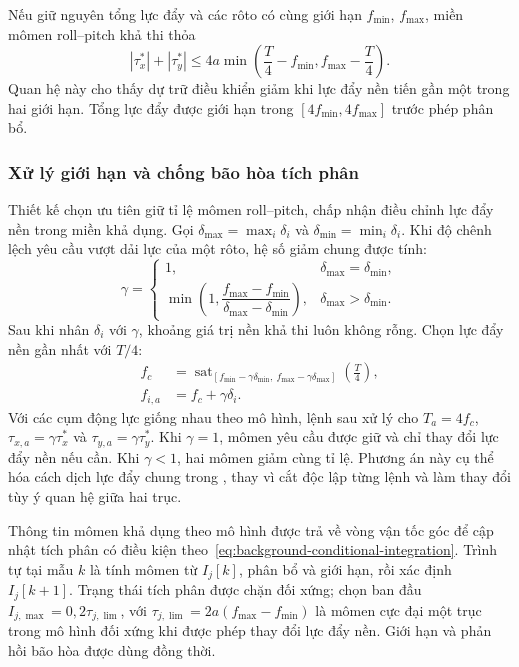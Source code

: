 Nếu giữ nguyên tổng lực đẩy và các rôto có cùng giới hạn $f_{\min}$, $f_{\max}$, miền mômen roll--pitch khả thi thỏa
\begin{equation}
	|\tau_x^*|+|\tau_y^*|
	\leq4a\min\left(\frac{T}{4}-f_{\min},
	f_{\max}-\frac{T}{4}\right).
	\label{eq:design-feasible-torque}
\end{equation}
Quan hệ này cho thấy dự trữ điều khiển giảm khi lực đẩy nền tiến gần một trong hai giới hạn. Tổng lực đẩy được giới hạn trong $[4f_{\min},4f_{\max}]$ trước phép phân bổ.

\subsubsection{Xử lý giới hạn và chống bão hòa tích phân}

Thiết kế chọn ưu tiên giữ tỉ lệ mômen roll--pitch, chấp nhận điều chỉnh lực đẩy nền trong miền khả dụng. Gọi $\delta_{\max}=\max_i\delta_i$ và $\delta_{\min}=\min_i\delta_i$. Khi độ chênh lệch yêu cầu vượt dải lực của một rôto, hệ số giảm chung được tính:
\begin{equation}
	\gamma=
	\begin{cases}
		1, & \delta_{\max}=\delta_{\min}, \\
		\min\left(1,\dfrac{f_{\max}-f_{\min}}
		{\delta_{\max}-\delta_{\min}}\right),
		   & \delta_{\max}>\delta_{\min}.
	\end{cases}
	\label{eq:design-allocation-scaling}
\end{equation}
Sau khi nhân $\delta_i$ với $\gamma$, khoảng giá trị nền khả thi luôn không rỗng. Chọn lực đẩy nền gần nhất với $T/4$:
\begin{equation}
	\begin{aligned}
		f_c     & =\operatorname{sat}_{
				[f_{\min}-\gamma\delta_{\min},\
		f_{\max}-\gamma\delta_{\max}]}\left(\frac{T}{4}\right), \\
		f_{i,a} & =f_c+\gamma\delta_i.
	\end{aligned}
	\label{eq:design-allocation-collective}
\end{equation}
Với các cụm động lực giống nhau theo mô hình, lệnh sau xử lý cho $T_a=4f_c$, $\tau_{x,a}=\gamma\tau_x^*$ và $\tau_{y,a}=\gamma\tau_y^*$. Khi $\gamma=1$, mômen yêu cầu được giữ và chỉ thay đổi lực đẩy nền nếu cần. Khi $\gamma<1$, hai mômen giảm cùng tỉ lệ. Phương án này cụ thể hóa cách dịch lực đẩy chung trong , thay vì cắt độc lập từng lệnh và làm thay đổi tùy ý quan hệ giữa hai trục.

Thông tin mômen khả dụng theo mô hình được trả về vòng vận tốc góc để cập nhật tích phân có điều kiện theo~\eqref{eq:background-conditional-integration}. Trình tự tại mẫu $k$ là tính mômen từ $I_j[k]$, phân bổ và giới hạn, rồi xác định $I_j[k+1]$. Trạng thái tích phân được chặn đối xứng; chọn ban đầu $I_{j,\max}=0{,}2\tau_{j,\lim}$, với $\tau_{j,\lim}=2a(f_{\max}-f_{\min})$ là mômen cực đại một trục trong mô hình đối xứng khi được phép thay đổi lực đẩy nền. Giới hạn và phản hồi bão hòa được dùng đồng thời.

